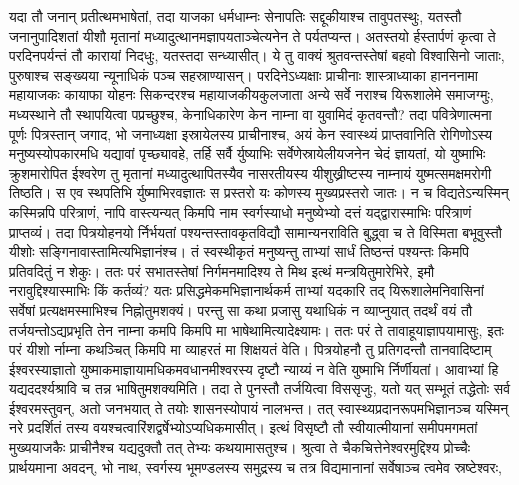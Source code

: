 \adhyAya
{}
\vakya यदा तौ जनान् प्रतीत्थमभाषेतां, तदा याजका धर्मधाम्नः सेनापतिः सद्दूकीयाश्च तावुपतस्थुः,
\vakya यतस्तौ जनानुपादिशतां यीशौ मृतानां मध्यादुत्थानमज्ञापयताञ्चेत्यनेन ते पर्यतप्यन्त।
\vakya अतस्तयो र्हस्तार्पणं कृत्वा ते परदिनपर्यन्तं तौ कारायां निदधुः, यतस्तदा सन्ध्यासीत्।
\vakya ये तु वाक्यं श्रुतवन्तस्तेषां बहवो विश्वासिनो जाताः, पुरुषाश्च सङ्ख्यया न्यूनाधिकं पञ्च सहस्राण्यासन्।
\vakya परदिनेऽध्यक्षाः प्राचीनाः शास्त्राध्याका हानननामा महायाजकः कायाफा योहनः सिकन्दरश्च
\vakya महायाजकीयकुलजाता अन्ये सर्वे नराश्च यिरूशालेमे समाजग्मुः,
\vakya मध्यस्थाने तौ स्थापयित्वा पप्रच्छुश्च, केनाधिकारेण केन नाम्ना वा युवामिदं कृतवन्तौ?
\vakya तदा पवित्रेणात्मना पूर्णः पित्रस्तान् जगाद,
\vakya भो जनाध्यक्षा इस्रायेलस्य प्राचीनाश्च, अयं केन स्वास्थ्यं प्राप्तवानिति रोगिणोऽस्य मनुष्यस्योपकारमधि यद्यावां पृच्छ्यावहे,
\vakya तर्हि सर्वै र्युष्याभिः सर्वेणेस्रायेलीयजनेन चेदं ज्ञायतां, यो युष्माभिः क्रुशमारोपित ईश्वरेण तु मृतानां मध्यादुत्थापितस्यैव नासरतीयस्य यीशुख्रीष्टस्य नाम्नायं युष्मत्समक्षमरोगी तिष्ठति।
\vakya स एव स्थपतिभि र्युष्माभिरवज्ञातः स प्रस्तरो यः कोणस्य मुख्यप्रस्तरो जातः।
\vakya न च विद्यतेऽन्यस्मिन् कस्मिन्नपि परित्राणं, नापि वास्त्यन्यत् किमपि नाम स्वर्गस्याधो मनुष्येभ्यो दत्तं यद्द्वारास्माभिः परित्राणं प्राप्तव्यं।
\vakya तदा पित्रयोहनयो र्निर्भयतां पश्यन्तस्तावकृतविद्यौ सामान्यनराविति बुद्ध्वा च ते विस्मिता बभूवुस्तौ यीशोः सङ्गिनावास्तामित्यभिज्ञानंश्च।
\vakya तं स्वस्थीकृतं मनुष्यन्तु ताभ्यां सार्धं तिष्ठन्तं पश्यन्तः किमपि प्रतिवदितुं न शेकुः।
\vakya ततः परं सभातस्तेषां निर्गमनमादिश्य ते मिथ इत्थं मन्त्रयितुमारेभिरे, इमौ नरावुद्दिश्यास्माभिः किं कर्तव्यं? यतः प्रसिद्धमेकमभिज्ञानार्थकर्म ताभ्यां यदकारि तद् यिरूशालेमनिवासिनां सर्वेषां प्रत्यक्षमस्माभिश्च निह्नोतुमशक्यं।
\vakya परन्तु सा कथा प्रजासु यथाधिकं न व्याप्नुयात् तदर्थं वयं तौ तर्जयन्तोऽद्यप्रभृति तेन नाम्ना कमपि किमपि मा भाषेथामित्यादेक्ष्यामः।
\vakya ततः परं ते तावाहूयाज्ञापयामासुः, इतः परं यीशो र्नाम्ना कथञ्चित् किमपि मा व्याहरतं मा शिक्षयतं वेति।
\vakya पित्रयोहनौ तु प्रतिगदन्तौ तानवादिष्टाम् ईश्वरस्याज्ञातो युष्माकमाज्ञायामधिकमवधानमीश्वरस्य दृष्टौ न्याय्यं न वेति युष्माभि र्निर्णीयतां।
\vakya आवाभ्यां हि यद्यददर्श्यश्रावि च तन्न भाषितुमशक्यमिति।
\vakya तदा ते पुनस्तौ तर्जयित्वा विससृजुः, यतो यत् सम्भूतं तद्धेतोः सर्व ईश्वरमस्तुवन्, अतो जनभयात् ते तयोः शासनस्योपायं नालभन्त।
\vakya तत् स्वास्थ्यप्रदानरूपमभिज्ञानञ्च यस्मिन् नरे प्रदर्शितं तस्य वयश्चत्वारिंशद्वर्षेभ्योऽप्यधिकमासीत्।
\vakya इत्थं विसृष्टौ तौ स्वीयात्मीयानां समीपमगमतां मुख्ययाजकैः प्राचीनैश्च यद्यदुक्तौ तत् तेभ्यः कथयामासतुश्च।
\vakya श्रुत्वा ते चैकचित्तेनेश्वरमुद्दिश्य प्रोच्चैः प्रार्थयमाना अवदन्, भो नाथ, स्वर्गस्य भूमण्डलस्य समुद्रस्य च तत्र विद्यमानानां सर्वेषाञ्च त्वमेव स्रष्टेश्वरः,
